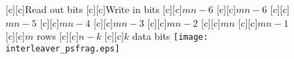 \documentclass{article}
\begin{document}
\begin{figure}[htb]
  \begin{center}


        [c][c]{Read out bits}
        [c][c]{Write in bits}
        [c][c]{$mn-6$}
[c][c]{$mn-6$} [c][c]{$mn-5$}
[c][c]{$mn-4$} [c][c]{$mn-3$}
[c][c]{$mn-2$} [c][c]{$mn$}
[c][c]{$mn-1$} [c][c]{$m$ rows}
[c][c]{$n-k$} [c][c]{$k$ data bits}
    \texttt{[image: interleaver\_psfrag.eps]}
    \end{center}
\end{figure}
\end{document}
